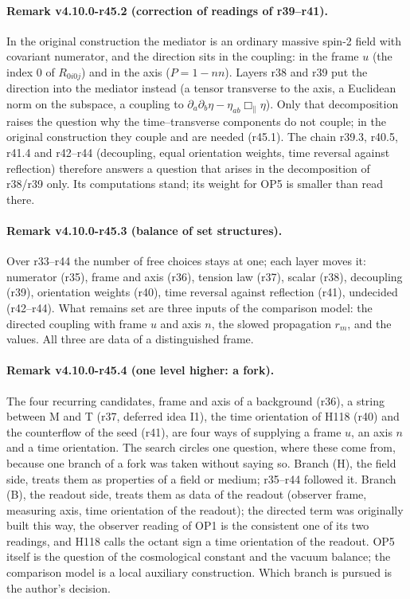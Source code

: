 \paragraph{Remark v4.10.0-r45.2 (correction of readings of r39--r41).}
In the original construction the mediator is an ordinary massive spin-2 field with covariant numerator, and the direction sits in the coupling:
in the frame \(u\) (the index 0 of \(R_{0i0j}\)) and in the axis (\(P=1-nn\)).  Layers r38 and r39 put the direction into the mediator instead (a tensor
transverse to the axis, a Euclidean norm on the subspace, a coupling to \(\partial_a\partial_b\eta-\eta_{ab}\Box_\parallel\eta\)).  Only that decomposition raises the
question why the time--transverse components do not couple; in the original construction they couple and are needed (r45.1).  The chain
r39.3, r40.5, r41.4 and r42--r44 (decoupling, equal orientation weights, time reversal against reflection) therefore answers a question that arises
in the decomposition of r38/r39 only.  Its computations stand; its weight for OP5 is smaller than read there.

\paragraph{Remark v4.10.0-r45.3 (balance of set structures).}
Over r33--r44 the number of free choices stays at one; each layer moves it: numerator (r35), frame and axis (r36), tension law (r37), scalar (r38),
decoupling (r39), orientation weights (r40), time reversal against reflection (r41), undecided (r42--r44).  What remains set are three inputs of the
comparison model: the directed coupling with frame \(u\) and axis \(n\), the slowed propagation \(r_m\), and the values.  All three are data of a
distinguished frame.

\paragraph{Remark v4.10.0-r45.4 (one level higher: a fork).}
The four recurring candidates, frame and axis of a background (r36), a string between M and T (r37, deferred idea I1), the time orientation of
H118 (r40) and the counterflow of the seed (r41), are four ways of supplying a frame \(u\), an axis \(n\) and a time orientation.  The search circles one
question, where these come from, because one branch of a fork was taken without saying so.  Branch (H), the field side, treats them as properties
of a field or medium; r35--r44 followed it.  Branch (B), the readout side, treats them as data of the readout (observer frame, measuring axis, time
orientation of the readout); the directed term was originally built this way, the observer reading of OP1 is the consistent one of its two
readings, and H118 calls the octant sign a time orientation of the readout.  OP5 itself is the question of the cosmological constant and the
vacuum balance; the comparison model is a local auxiliary construction.  Which branch is pursued is the author's decision.

